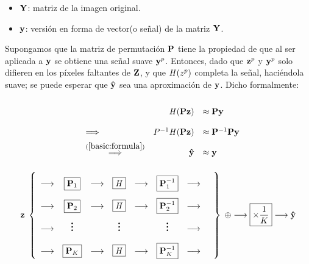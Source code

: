 \begin{itemize}
	\item $\Y$: matriz de la imagen original. 
	\item $\y$: versión en forma de vector(o señal) de la matriz $\Y$.
\end{itemize}

Supongamos que la matriz de permutaci\'on $\P$ tiene la propiedad de que al ser aplicada a $\y$ se obtiene una señal suave $\y^p$. Entonces, dado que $\z^p$ y $\y^p$ solo difieren en los p\'ixeles faltantes de $\Z$, y que $\H(z^p)$ completa la señal, haciéndola suave; se puede esperar que $\yhat$ sea una aproximaci\'on de $\y$. Dicho formalmente:

\begin{equation}
	\def\arraystretch{2}
	\begin{array}{llrl}
	&                                        &     \H (\P\z ) &\approx \P\y        \\ 
	&\Longrightarrow                         & P^{-1}\H(\P\z) &\approx \P^{-1}\P\y \\
	&\overset{(\ref{basic:formula})}{\Longrightarrow} & \yhat &\approx \y          \\
	\end{array}
\end{equation}


\begin{equation}
	\z\;\left\{
	\def\arraystretch{2.2}
	\begin{array}{ccccccccc}
		\longrightarrow & \boxed{\P_1} & \longrightarrow & \boxed{\H} & \longrightarrow & \boxed{\P_1^{-1}} & \longrightarrow \\
		\longrightarrow & \boxed{\P_2} & \longrightarrow & \boxed{\H} & \longrightarrow & \boxed{\P_2^{-1}} & \longrightarrow \\
		\longrightarrow & \huge\vdots &  & \huge\vdots &  & \huge\vdots & \longrightarrow & \\
		\longrightarrow & \boxed{\P_K} & \longrightarrow & \boxed{\H} & \longrightarrow & \boxed{\P_K^{-1}} & \longrightarrow
	\end{array}
	\right\}\;\oplus\longrightarrow\boxed{\times\frac{1}{K}}\longrightarrow\yhat
\end{equation}

